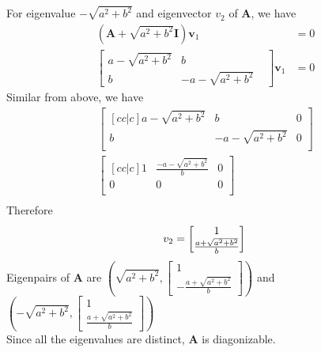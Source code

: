 \documentclass[12pt]{article}
\newcommand{\matr}[1]{\bm{#1}}
\begin{document}
For eigenvalue $-\sqrt{a^2+b^2}$ and eigenvector $v_2$ of $\matr A$, we have
\begin{align}
	\left(\matr A+\sqrt{a^2+b^2} \matr I\right) \matr v_1 & = 0 \\
	\begin{bmatrix}
	a - \sqrt{a^{2} + b^{2}} & b                          &   \\
	b                        & - a - \sqrt{a^{2} + b^{2}} &   
	\end{bmatrix} 
	\matr v_1                             & =0  
\end{align}
Similar from above, we have
\begin{align}
	\begin{bmatrix}[cc|c]
	a - \sqrt{a^{2} + b^{2}} & b                                       & 0 \\
	b                        & - a - \sqrt{a^{2} + b^{2}}              & 0 \\
	\end{bmatrix} \\
	\begin{bmatrix}[cc|c]
	1                        & \frac  {-a - \sqrt{a^{2} + b^{2}}}    b & 0 \\
	0                        & 0                                       & 0 \\
	\end{bmatrix} \\
\end{align}
Therefore
\begin{equation}
	v_2=\begin{bmatrix}
	1 \\
	\frac  {a + \sqrt{a^{2} + b^{2}}} b
	\end{bmatrix} \\
\end{equation} 
Eigenpairs of $\matr A$ are $\left(
\sqrt{a^2+b^2},
\begin{bmatrix}
	1                                     \\
	- \frac  {a + \sqrt{a^{2} + b^{2}}} b 
\end{bmatrix}
\right)$ and $\left(
-\sqrt{a^2+b^2},
\begin{bmatrix}
	1                                   \\ 
	\frac  {a + \sqrt{a^{2} + b^{2}}} b 
\end{bmatrix}
\right)$\\
Since all the eigenvalues are distinct, $\matr A$ is diagonizable. \\ \\
\end{document}
